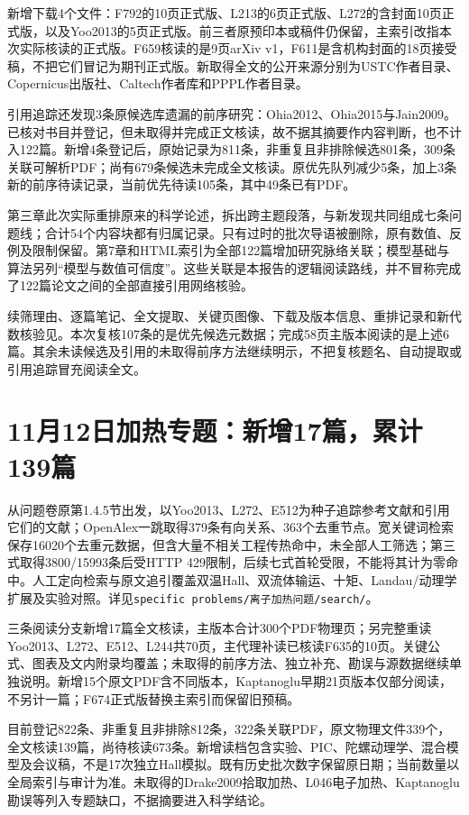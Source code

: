 新增下载4个文件：F792的10页正式版、L213的6页正式版、L272的含封面10页正式版，以及Yoo2013的5页正式版。前三者原预印本或稿件仍保留，主索引改指本次实际核读的正式版。F659核读的是9页arXiv v1，F611是含机构封面的18页接受稿，不把它们冒记为期刊正式版。新取得全文的公开来源分别为USTC作者目录、Copernicus出版社、Caltech作者库和PPPL作者目录。

引用追踪还发现3条原候选库遗漏的前序研究：Ohia2012、Ohia2015与Jain2009。已核对书目并登记，但未取得并完成正文核读，故不据其摘要作内容判断，也不计入122篇。新增4条登记后，原始记录为811条，非重复且非排除候选801条，309条关联可解析PDF；尚有679条候选未完成全文核读。原优先队列减少5条，加上3条新的前序待读记录，当前优先待读105条，其中49条已有PDF。

第三章此次实际重排原来的科学论述，拆出跨主题段落，与新发现共同组成七条问题线；合计54个内容块都有归属记录。只有过时的批次导语被删除，原有数值、反例及限制保留。第7章和HTML索引为全部122篇增加研究脉络关联；模型基础与算法另列“模型与数值可信度”。这些关联是本报告的逻辑阅读路线，并不冒称完成了122篇论文之间的全部直接引用网络核验。

续筛理由、逐篇笔记、全文提取、关键页图像、下载及版本信息、重排记录和新代数核验见。本次复核107条的是优先候选元数据；完成58页主版本阅读的是上述6篇。其余未读候选及引用的未取得前序方法继续明示，不把复核题名、自动提取或引用追踪冒充阅读全文。

\section{11月12日加热专题：新增17篇，累计139篇}
从问题卷原第1.4.5节出发，以Yoo2013、L272、E512为种子追踪参考文献和引用它们的文献；OpenAlex一跳取得379条有向关系、363个去重节点。宽关键词检索保存16020个去重元数据，但含大量不相关工程传热命中，未全部人工筛选；第三式取得3800/15993条后受HTTP 429限制，后续七式首轮受限，不能将其计为零命中。人工定向检索与原文追引覆盖双温Hall、双流体输运、十矩、Landau/动理学扩展及实验对照。详见\texttt{specific problems/离子加热问题/search/}。

三条阅读分支新增17篇全文核读，主版本合计300个PDF物理页；另完整重读Yoo2013、L272、E512、L244共70页，主代理补读已核读F635的10页。关键公式、图表及文内附录均覆盖；未取得的前序方法、独立补充、勘误与源数据继续单独说明。新增15个原文PDF含不同版本，Kaptanoglu早期21页版本仅部分阅读，不另计一篇；F674正式版替换主索引而保留旧预稿。

目前登记822条、非重复且非排除812条，322条关联PDF，原文物理文件339个，全文核读139篇，尚待核读673条。新增读档包含实验、PIC、陀螺动理学、混合模型及会议稿，不是17次独立Hall模拟。既有历史批次数字保留原日期；当前数量以全局索引与审计为准。未取得的Drake2009拾取加热、L046电子加热、Kaptanoglu勘误等列入专题缺口，不据摘要进入科学结论。

